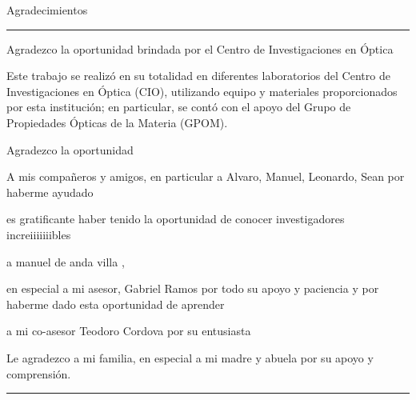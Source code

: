 \begin{vcenterpage}
{\LARGE{\sc Agradecimientos}}

\noindent\rule[2pt]{\textwidth}{0.5pt}


Agradezco la oportunidad brindada por el Centro de Investigaciones en \'Optica 




Este trabajo se realiz\'o en su totalidad en diferentes laboratorios del Centro de Investigaciones en \'Optica (CIO), utilizando equipo y materiales proporcionados por esta instituci\'on; en particular, se cont\'o con el apoyo del Grupo de Propiedades \'Opticas de la Materia (GPOM). 

Agradezco la oportunidad 






A mis compa\~{n}eros y amigos, en particular a Alvaro, Manuel, Leonardo, Sean por haberme ayudado  





es gratificante haber tenido la oportunidad de conocer investigadores increiiiiiiibles 


a manuel de anda villa , 

en especial a mi asesor, Gabriel Ramos por todo su apoyo y paciencia y por haberme dado esta oportunidad de aprender  

a mi co-asesor Teodoro Cordova por su entusiasta 






Le agradezco a mi familia, en especial a mi madre y abuela por su apoyo y comprensi\'on.





\noindent\rule[2pt]{\textwidth}{0.5pt}
\end{vcenterpage}

